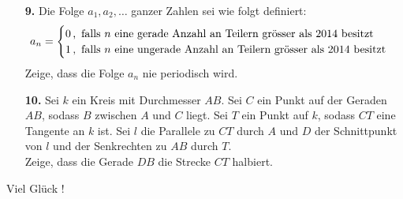 \documentclass[11pt,a4paper]{article}
\theoremstyle{plain}
\theoremstyle{definition}
\begin{document}
\begin{enumerate}
\item[\textbf{9.}]
Die Folge $a_1, a_2, \ldots $ ganzer Zahlen sei wie folgt definiert:
\[
a_n = 
\begin{cases}
0 \text{\,,\, falls $n$ eine gerade Anzahl an Teilern grösser als 2014 besitzt}\\
1 \text{\,,\, falls $n$ eine ungerade Anzahl an Teilern grösser als 2014 besitzt}
\end{cases}
\] 
Zeige, dass die Folge $a_n$ nie periodisch wird.

\bigskip

\item[\textbf{10.}] 
Sei $k$ ein Kreis mit Durchmesser $AB$. Sei $C$ ein Punkt auf der Geraden $AB$, sodass $B$ zwischen $A$ und $C$ liegt. Sei $T$ ein Punkt auf $k$, sodass $CT$ eine Tangente an $k$ ist. Sei $l$ die Parallele zu $CT$ durch $A$ und $D$ der Schnittpunkt von $l$ und der Senkrechten zu $AB$ durch $T$.\\
Zeige, dass die Gerade $DB$ die Strecke $CT$ halbiert.

\end{enumerate}
\bigskip
\begin{center}
Viel Glück !
\end{center}
\end{document}
